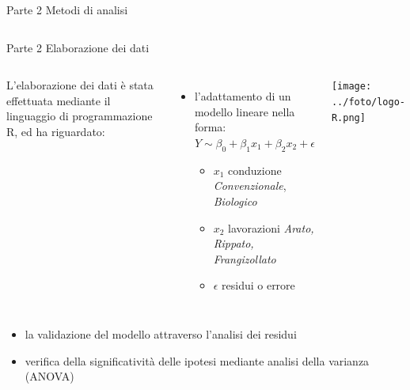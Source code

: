 \documentclass[10pt]{beamer}
\begin{document}
\begin{frame}{Parte 2 \small{Metodi di analisi}}
\begin{columns}[c]
  \end{columns}
\end{frame}



\begin{frame}{Parte 2 \small{Elaborazione dei dati}}
  \begin{minipage}[0.2\textheight]{\textwidth}
    \begin{columns}[T]
      L'elaborazione dei dati è stata effettuata mediante il linguaggio di
      programmazione R, ed ha riguardato:
      \begin{itemize}
        \item l'adattamento di un modello lineare nella forma:
        \vspace{0.25cm}
        $Y \sim \beta_0 + \beta_1x_1 + \beta_2x_2 + \epsilon$

        \begin{itemize}
          \item $x_1$ conduzione %
          \emph{Convenzionale}, \emph{Biologico}

          \item $x_2$ lavorazioni \newline \emph{Arato, Rippato,
            Frangizollato}

          \item $\epsilon$ residui o errore
        \end{itemize}
      \end{itemize}
      \texttt{[image: ../foto/logo-R.png]}
    \end{columns}
  \end{minipage}

  \begin{itemize}
    \item la validazione del modello attraverso l'analisi
    dei residui 
    \item verifica della significatività delle
    ipotesi mediante analisi della varianza (ANOVA)
  \end{itemize}
\end{frame}
\end{document}
